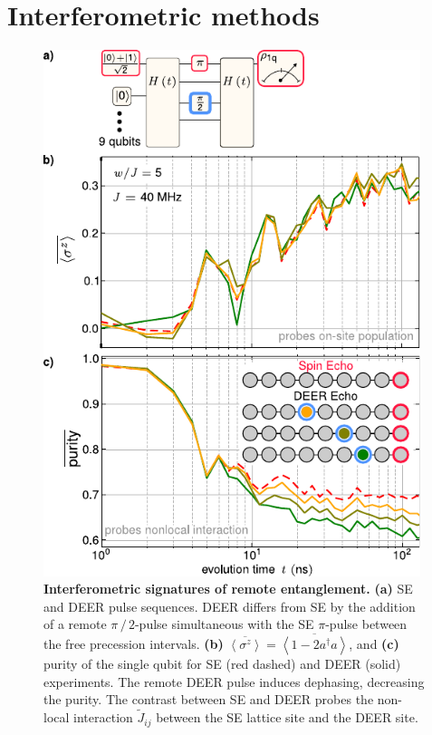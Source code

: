 \section{Interferometric methods} %
\begin{figure}[t]
 \centering
 \includegraphics[width=110mm]{./PDF/fig_3.pdf}
 \caption{
 \textbf{Interferometric signatures of remote entanglement.}
 \textbf{(a)} SE and DEER pulse sequences. DEER differs from SE by the addition of a remote $\pi\, /\,2$-pulse simultaneous with the SE $\pi$-pulse between the free precession intervals. \textbf{(b)}  $\overline{ \left< \sigma^z \right> } =\overline{ \left< 1 - 2 a^\dagger a \right> }$, and \textbf{(c)}  purity of the single qubit for SE (red dashed) and DEER (solid) experiments. The remote DEER pulse induces dephasing, decreasing the purity. The contrast between SE and DEER probes the non-local interaction $\widetilde{J}_{ij}$ between the SE lattice site and the DEER site.}
 \label{ch5:interferometric_signatures}
\end{figure}

